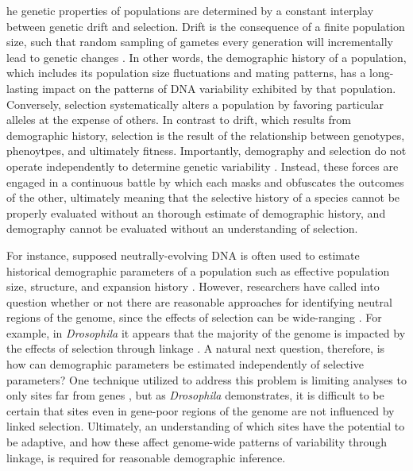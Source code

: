 \documentclass{pnastwo}
\begin{document}
\begin{article}
he genetic properties of populations are determined by a constant interplay between genetic drift and selection. Drift is the consequence of a finite population size, such that random sampling of gametes every generation will incrementally lead to genetic changes \cite{dobzhansky1957}. In other words, the demographic history of a population, which includes its population size fluctuations and mating patterns, has a long-lasting impact on the patterns of DNA variability exhibited by that population. Conversely, selection systematically alters a population by favoring particular alleles at the expense of others. In contrast to drift, which results from demographic history, selection is the result of the relationship between genotypes, phenoytpes, and ultimately fitness. Importantly, demography and selection do not operate independently to determine genetic variability \cite{li2012}. Instead, these forces are engaged in a continuous battle by which each masks and obfuscates the outcomes of the other, ultimately meaning that the selective history of a species cannot be properly evaluated without an thorough estimate of demographic history, and demography cannot be evaluated without an understanding of selection.

For instance, supposed neutrally-evolving DNA is often used to estimate historical demographic
parameters of a population such as effective population size, structure, and expansion
history \cite{luikart2003, gutenkunst2009}. However, researchers have
called into question whether or not there are reasonable approaches
for identifying neutral regions of the genome, since the effects of
selection can be wide-ranging \cite{li2012, slotte2014}. For example, in
\emph{Drosophila} it appears that the majority of the genome is
impacted by the effects of selection through linkage
\cite{sella2009}. A natural next question, therefore, is how can
demographic parameters be estimated independently of
selective parameters? One technique utilized to address this
problem is limiting analyses to only sites far from genes
\cite{gazave2014}, but as \emph{Drosophila} demonstrates, it is
difficult to be certain that sites even in gene-poor regions of the
genome are not influenced by linked selection. Ultimately, an understanding
of which sites have the potential to be adaptive, and how these affect
genome-wide patterns of variability through linkage, is required for
reasonable demographic inference.


\end{article}
\end{document}
